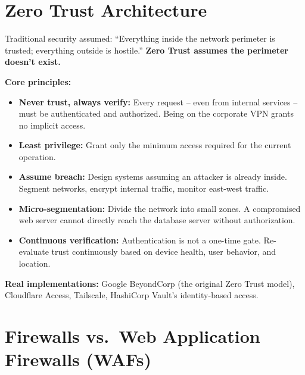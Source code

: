 \documentclass[11pt, letterpaper]{article}
\begin{document}
\section*{Zero Trust Architecture}

Traditional security assumed: ``Everything inside the network perimeter is trusted; everything outside is hostile.'' \textbf{Zero Trust assumes the perimeter doesn't exist.}

\textbf{Core principles:}
\begin{itemize}[noitemsep]
  \item \textbf{Never trust, always verify:} Every request -- even from internal services -- must be authenticated and authorized. Being on the corporate VPN grants no implicit access.
  \item \textbf{Least privilege:} Grant only the minimum access required for the current operation.
  \item \textbf{Assume breach:} Design systems assuming an attacker is already inside. Segment networks, encrypt internal traffic, monitor east-west traffic.
  \item \textbf{Micro-segmentation:} Divide the network into small zones. A compromised web server cannot directly reach the database server without authorization.
  \item \textbf{Continuous verification:} Authentication is not a one-time gate. Re-evaluate trust continuously based on device health, user behavior, and location.
\end{itemize}

\textbf{Real implementations:} Google BeyondCorp (the original Zero Trust model), Cloudflare Access, Tailscale, HashiCorp Vault's identity-based access.

\section*{Firewalls vs.\ Web Application Firewalls (WAFs)}
\end{document}

